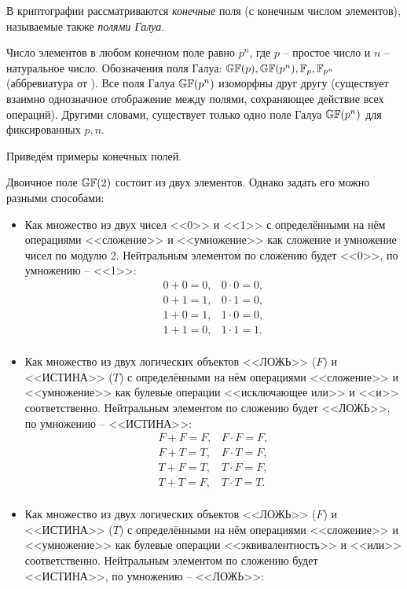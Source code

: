В криптографии рассматриваются \emph{конечные} поля (с конечным числом элементов), называемые также \emph{полями Галуа}.

Число элементов в любом конечном поле равно $p^n$, где $p$ -- простое число и $n$ -- натуральное число. Обозначения поля Галуа: $\mathbb{GF}(p), \mathbb{GF}(p^n), \mathbb{F}_p, \mathbb{F}_{p^n}$ (аббревиатура от ). Все поля Галуа $\mathbb{GF}(p^n)$ изоморфны друг другу (существует взаимно однозначное отображение между полями, сохраняющее действие всех операций). Другими словами, существует только одно поле Галуа $\mathbb{GF}(p^n)$ для фиксированных $p, n$.

Приведём примеры конечных полей.

Двоичное поле $\mathbb{GF}(2)$ состоит из двух элементов. Однако задать его можно разными способами:
\begin{itemize}
	\item Как множество из двух чисел <<0>> и <<1>> с определёнными на нём операциями <<сложение>> и <<умножение>> как сложение и умножение чисел по модулю 2. Нейтральным элементом по сложению будет <<0>>, по умножению -- <<1>>:
\[\begin{array}{ll}
	0 + 0 = 0,	& 	0 \cdot 0 = 0, \\
	0 + 1 = 1,	& 	0 \cdot 1 = 0, \\
	1 + 0 = 1,	& 	1 \cdot 0 = 0, \\
	1 + 1 = 0,	& 	1 \cdot 1 = 1. \\
\end{array}\]
	\item Как множество из двух логических объектов <<ЛОЖЬ>> ($F$) и <<ИСТИНА>> ($T$) с определёнными на нём операциями <<сложение>> и <<умножение>> как булевые операции <<исключающее или>> и <<и>> соответственно. Нейтральным элементом по сложению будет <<ЛОЖЬ>>, по умножению -- <<ИСТИНА>>:
\[\begin{array}{ll}
	F + F = F,	& 	F \cdot F = F, \\
	F + T = T,	& 	F \cdot T = F, \\
	T + F = T,	& 	T \cdot F = F, \\
	T + T = F,	& 	T \cdot T = T. \\
\end{array}\]
	\item Как множество из двух логических объектов <<ЛОЖЬ>> ($F$) и <<ИСТИНА>> ($T$) с определёнными на нём операциями <<сложение>> и <<умножение>> как булевые операции <<эквивалентность>> и <<или>> соответственно. Нейтральным элементом по сложению будет <<ИСТИНА>>, по умножению -- <<ЛОЖЬ>>:

\end{itemize}
